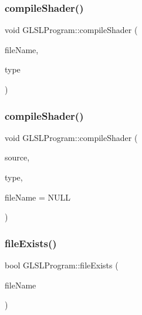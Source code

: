 \subsubsection{\texorpdfstring{compileShader()}{compileShader()}\hspace{0.1cm}{\footnotesize\ttfamily [2/3]}}
{\footnotesize\ttfamily void G\+L\+S\+L\+Program\+::compile\+Shader (\begin{DoxyParamCaption}\item[{const char $\ast$}]{file\+Name,  }\item[{\mbox{\hyperlink{namespace_g_l_s_l_shader_a5da03bdfde28d414fcf090182b3b8177}{G\+L\+S\+L\+Shader\+::\+G\+L\+S\+L\+Shader\+Type}}}]{type }\end{DoxyParamCaption})}

\mbox{\label{class_g_l_s_l_program_aa6dc9e2153e3cd83ff24042be9805077}} 
\subsubsection{\texorpdfstring{compileShader()}{compileShader()}\hspace{0.1cm}{\footnotesize\ttfamily [3/3]}}
{\footnotesize\ttfamily void G\+L\+S\+L\+Program\+::compile\+Shader (\begin{DoxyParamCaption}\item[{const std\+::string \&}]{source,  }\item[{\mbox{\hyperlink{namespace_g_l_s_l_shader_a5da03bdfde28d414fcf090182b3b8177}{G\+L\+S\+L\+Shader\+::\+G\+L\+S\+L\+Shader\+Type}}}]{type,  }\item[{const char $\ast$}]{file\+Name = {\ttfamily NULL} }\end{DoxyParamCaption})}

\mbox{\label{class_g_l_s_l_program_afe8f370b74009d2b1074b588ec2e9bab}} 
\subsubsection{\texorpdfstring{fileExists()}{fileExists()}}
{\footnotesize\ttfamily bool G\+L\+S\+L\+Program\+::file\+Exists (\begin{DoxyParamCaption}\item[{const std\+::string \&}]{file\+Name }\end{DoxyParamCaption})\hspace{0.3cm}{\ttfamily [private]}}

